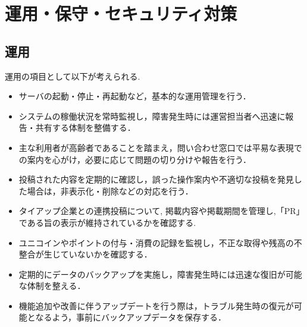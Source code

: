 \section{運用・保守・セキュリティ対策}
\subsection{運用}
運用の項目として以下が考えられる.
\begin{itemize}
    \item サーバの起動・停止・再起動など，基本的な運用管理を行う．

    \item システムの稼働状況を常時監視し，障害発生時には運営担当者へ迅速に報告・共有する体制を整備する．

    \item 主な利用者が高齢者であることを踏まえ，問い合わせ窓口では平易な表現での案内を心がけ，必要に応じて問題の切り分けや報告を行う．

    \item 投稿された内容を定期的に確認し，誤った操作案内や不適切な投稿を発見した場合は，非表示化・削除などの対応を行う．

    \item タイアップ企業との連携投稿について, 掲載内容や掲載期間を管理し,「PR」である旨の表示が維持されているかを確認する.

    \item ユニコインやポイントの付与・消費の記録を監視し，不正な取得や残高の不整合が生じていないかを確認する．

    \item 定期的にデータのバックアップを実施し，障害発生時には迅速な復旧が可能な体制を整える．

    \item 機能追加や改善に伴うアップデートを行う際は，トラブル発生時の復元が可能となるよう，事前にバックアップデータを保存する．
\end{itemize}
